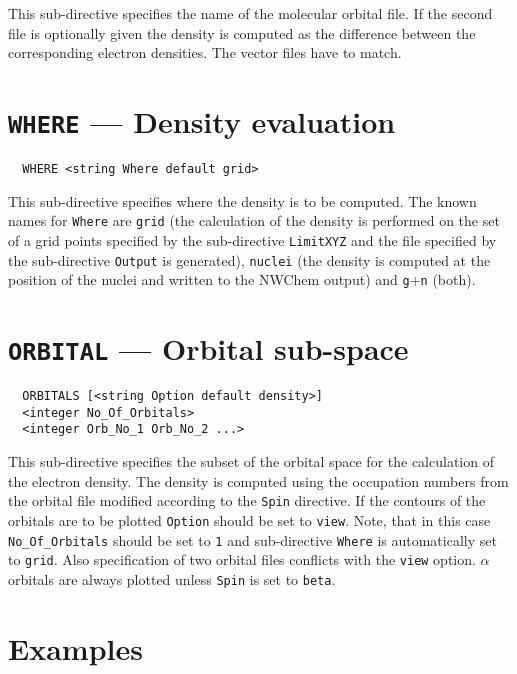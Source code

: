 This sub-directive specifies the name of the molecular orbital file.
If the second file is optionally given the density is computed as the
difference between the corresponding electron densities. The vector 
files have to match.



\section{{\tt WHERE} --- Density evaluation}

\begin{verbatim}
  WHERE <string Where default grid>
\end{verbatim}

This sub-directive specifies where the density is to be computed.
The known names for \verb+Where+ are \verb+grid+ (the calculation of
the density is performed on the set of a grid points specified by the
sub-directive \verb+LimitXYZ+ and the file specified by the sub-directive
\verb+Output+ is generated), \verb+nuclei+ (the density is computed at
the position of the nuclei and written to the NWChem output) and
\verb+g++\verb+n+ (both).


\section{{\tt ORBITAL} --- Orbital sub-space}

\begin{verbatim}
  ORBITALS [<string Option default density>]
  <integer No_Of_Orbitals>
  <integer Orb_No_1 Orb_No_2 ...>
\end{verbatim}

This sub-directive specifies the subset of the orbital space for the
calculation of the electron density. The density is computed using the
occupation numbers from the orbital file modified according to the
\verb+Spin+ directive. If the contours of the orbitals are to be plotted
\verb+Option+ should be set to \verb+view+. Note, that in this case
\verb+No_Of_Orbitals+ should be set to \verb+1+ and sub-directive
\verb+Where+ is automatically set to \verb+grid+. Also specification
of two orbital files conflicts with the \verb+view+ option.
$\alpha$ orbitals are always plotted unless \verb+Spin+ is set to
\verb+beta+.

\section{Examples}

